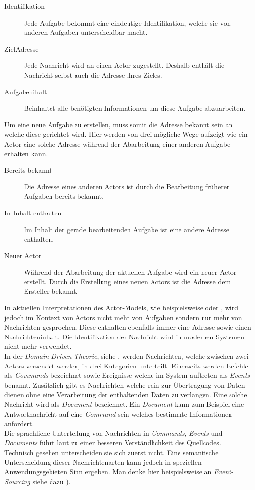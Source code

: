 \begin{description}
  \item[Identifikation] Jede Aufgabe bekommt eine eindeutige Identifikation, welche sie von anderen Aufgaben unterscheidbar macht.
  \item[ZielAdresse] Jede Nachricht wird an einen Actor zugestellt. Deshalb enthält die Nachricht selbst auch die Adresse ihres Zieles.
  \item[Aufgabenihalt] Beinhaltet alle benötigten Informationen um diese Aufgabe abzuarbeiten.
\end{description} 
Um eine neue Aufgabe zu erstellen, muss somit die Adresse bekannt sein an welche diese gerichtet wird. Hier werden von \cite{Agha1985ActorsSystems} drei mögliche Wege aufzeigt wie ein Actor eine solche Adresse während der Abarbeitung einer anderen Aufgabe erhalten kann.
\begin{description}
  \item[Bereits bekannt] Die Adresse eines anderen Actors ist durch die Bearbeitung früherer Aufgaben bereits bekannt.
  \item[In Inhalt enthalten] Im Inhalt der gerade bearbeitenden Aufgabe ist eine andere Adresse enthalten.
  \item[Neuer Actor] Während der Abarbeitung der aktuellen Aufgabe wird ein neuer Actor erstellt. 
  Durch die Erstellung eines neuen Actors ist die Adresse dem Ersteller bekannt.  
\end{description}
In aktuellen Interpretationen des Actor-Models, wie beispielsweise \cite{Vernon2015ReactiveAkka} oder \cite{Brown2016ReactiveAkka.NET.}, wird jedoch im Kontext von Actors nicht mehr von Aufgaben sondern nur mehr von Nachrichten gesprochen. Diese enthalten ebenfalls immer eine Adresse sowie einen Nachrichteninhalt. Die Identifikation der Nachricht wird in modernen Systemen nicht mehr verwendet.  \\
In der \textit{Domain-Driven-Theorie}, siehe \cite{Evans2004Domain-drivenSoftware}, werden Nachrichten, welche zwischen zwei Actors versendet werden, in drei Kategorien unterteilt. Einerseits werden Befehle als \textit{Commands} bezeichnet sowie Ereignisse welche im System auftreten als \textit{Events} benannt. Zusätzlich gibt es Nachrichten welche rein zur Übertragung von Daten dienen ohne eine Verarbeitung der enthaltenden Daten zu verlangen. Eine solche Nachricht wird als \textit{Document} bezeichnet. Ein \textit{Document} kann zum Beispiel eine Antwortnachricht auf eine \textit{Command} sein welches bestimmte Informationen anfordert.\\
Die sprachliche Unterteilung von Nachrichten in \textit{Commands}, \textit{Events} und \textit{Documents} führt laut \cite{Evans2004Domain-drivenSoftware} zu einer besseren Verständlichkeit des Quellcodes. Technisch gesehen unterscheiden sie sich zuerst nicht. Eine semantische Unterscheidung dieser Nachrichtenarten kann jedoch in speziellen Anwendungsgebieten Sinn ergeben. Man denke hier beispielsweise an \textit{Event-Sourcing} siehe dazu \cite{betts2013CQRSEventSourcing}).

